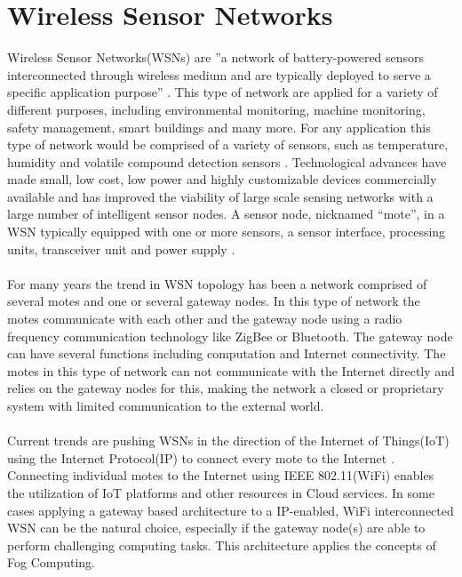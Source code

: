 \documentclass[]{uiophd}
\begin{document}
\section{Wireless Sensor Networks}
Wireless Sensor Networks(WSNs) are ''a network of battery-powered sensors interconnected through wireless medium and are typically deployed to serve a specific application purpose'' \parencite{Ojha2015662}. This type of network are applied for a variety of different purposes, including environmental monitoring, machine monitoring, safety management, smart buildings and many more. For any application this type of network would be comprised of a variety of sensors, such as temperature, humidity and volatile compound detection sensors \parencite{s90604728}. Technological advances have made small, low cost, low power and highly customizable devices commercially available and has improved the viability of large scale sensing networks with a large number of intelligent sensor nodes. A sensor node, nicknamed “mote”, in a WSN typically equipped with one or more sensors, a sensor interface, processing units, transceiver unit and power supply \parencite{Gubbi20131645}.
\\\\
For many years the trend in WSN topology has been a network comprised of several motes and one or several gateway nodes. In this type of network the motes communicate with each other and the gateway node using a radio frequency communication technology like ZigBee or Bluetooth. The gateway node can have several functions including computation and Internet connectivity. The motes in this type of network can not communicate with the Internet directly and relies on the gateway nodes for this, making the network a closed or proprietary system with limited communication to the external world. 
\\\\
Current trends are pushing WSNs in the direction of the Internet of Things(IoT) using the Internet Protocol(IP) to connect every mote to the Internet \parencite{6064380}. Connecting individual motes to the Internet using IEEE 802.11(WiFi) enables the utilization of IoT platforms and other resources in Cloud services. In some cases applying a gateway based architecture to a IP-enabled, WiFi interconnected WSN can be the natural choice, especially if the gateway node(s) are able to perform challenging computing tasks. This architecture applies the concepts of Fog Computing.
\\\\
\end{document}
